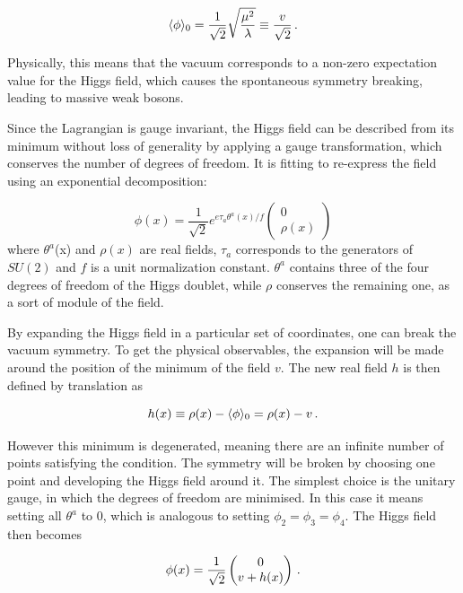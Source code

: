 \begin{equation}
    \langle \phi \rangle_0 = \frac{1}{\sqrt{2}}\sqrt{\frac{\mu^2}{\lambda}} \equiv \frac{v}{\sqrt{2}} \mend
\end{equation}

Physically, this means that the vacuum corresponds to a non-zero expectation value for the Higgs field, which causes the spontaneous symmetry breaking, leading to massive weak bosons.

Since the Lagrangian is gauge invariant, the Higgs field can be described from its minimum without loss of generality by applying a gauge transformation, which conserves the number of degrees of freedom. It is fitting to re-express the field using an exponential decomposition:

\begin{equation}
    \phi(x) = \frac{1}{\sqrt{2}}e^{e\tau_a \theta^a (x) / f} \begin{pmatrix} 0 \\ \rho(x) \end{pmatrix}
\end{equation}
where $\theta^a$(x) and $\rho(x)$ are real fields, $\tau_a$ corresponds to the generators of $SU(2)$ and $f$ is a unit normalization constant. $\theta^a$ contains three of the four degrees of freedom of the Higgs doublet, while $\rho$ conserves the remaining one, as a sort of module of the field.\newline

By expanding the Higgs field in a particular set of coordinates, one can break the vacuum symmetry. To get the physical observables, the expansion will be made around the position of the minimum of the field $v$. The new real field $h$ is then defined by translation as

\begin{equation}
    h(x) \equiv \rho (x) - \langle \phi \rangle_0 = \rho(x) - v \mend
\end{equation}

However this minimum is degenerated, meaning there are an infinite number of points satisfying the condition. The symmetry will be broken by choosing one point and developing the Higgs field around it. The simplest choice is the unitary gauge, in which the degrees of freedom are minimised. In this case it means setting all $\theta^a$ to 0, which is analogous to setting $\phi_2 = \phi_3 = \phi_4$. The Higgs field then becomes

\begin{equation}
    \phi(x) = \frac{1}{\sqrt{2}} \begin{pmatrix} 0 \\ v + h(x) \end{pmatrix} \mend
    \label{eq:simphiggsfield}
\end{equation}

